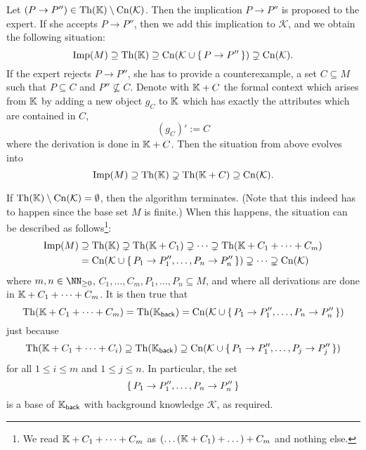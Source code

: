 Let $(P \to P'') \in \operatorname{Th}({\mathbb{K}}) \setminus \operatorname{Cn}(\mathcal{K})$.  Then the implication $P \to
P''$ is proposed to the expert.  If she accepts $P \to P''$, then we add this implication
to $\mathcal{K}$, and we obtain the following situation:
\begin{equation*}
  \operatorname{Imp}(M) \supseteq \operatorname{Th}({\mathbb{K}}) \supseteq \operatorname{Cn}(\mathcal{K} \cup {\ensuremath{\{\, P \to P'' \,\}}})
  \supsetneq \operatorname{Cn}(\mathcal{K}).
\end{equation*}
If the expert rejects $P \to P''$, she has to provide a counterexample, \ie a set $C
\subseteq M$ such that $P \subseteq C$ and $P'' \not\subseteq C$.  Denote with ${\mathbb{K}} +
C$ the formal context which arises from ${\mathbb{K}}$ by adding a new object $g_C$ to ${\mathbb{K}}$
which has exactly the attributes which are contained in $C$, \ie
\begin{equation*}
  (g_C)' := C
\end{equation*}
where the derivation is done in ${\mathbb{K}} + C$.  Then the situation from above evolves into
\begin{equation*}
  \operatorname{Imp}(M) \supseteq \operatorname{Th}({\mathbb{K}}) \supsetneq \operatorname{Th}({\mathbb{K}} + C) \supseteq \operatorname{Cn}(\mathcal{K}).
\end{equation*}

If $\operatorname{Th}({\mathbb{K}}) \setminus \operatorname{Cn}(\mathcal{K}) = \emptyset$, then the algorithm terminates.
(Note that this indeed has to happen since the base set $M$ is finite.)  When this
happens, the situation can be described as follows\footnote{We read ${\mathbb{K}} + C_1 + \dots
  + C_m$ as $(\dots({\mathbb{K}} + C_1) + \dots ) + C_m$ and nothing else.}:
\begin{align*}
  \operatorname{Imp}(M) &\supseteq \operatorname{Th}({\mathbb{K}}) \supsetneq \operatorname{Th}({\mathbb{K}} + C_1) \supsetneq \dots \supsetneq
  \operatorname{Th}({\mathbb{K}} + C_1 + \dots + C_m) \\ &= \operatorname{Cn}(\mathcal{K} \cup {\ensuremath{\{\, P_1 \to P_1'', \dots, P_n
    \to P_n'' \,\}}}) \supsetneq \dots \supsetneq \operatorname{Cn}(\mathcal{K})
\end{align*}
where $m, n \in \NN_{\geq 0}$, $C_1, \dots, C_m, P_1, \dots, P_n \subseteq M$, and where
all derivations are done in ${\mathbb{K}} + C_1 + \dots + C_m$.  It is then true that
\begin{equation*}
  \operatorname{Th}({\mathbb{K}} + C_1 + \dots + C_m) = \operatorname{Th}({\mathbb{K}}_{\mathsf{back}}) = \operatorname{Cn}(\mathcal{K} \cup
  {\ensuremath{\{\, P_1 \to P_1'', \dots, P_n \to P_n'' \,\}}})
\end{equation*}
just because
\begin{equation*}
  \operatorname{Th}({\mathbb{K}} + C_1 + \dots + C_i) \supseteq \operatorname{Th}({\mathbb{K}}_{\mathsf{back}}) \supseteq
  \operatorname{Cn}(\mathcal{K} \cup {\ensuremath{\{\, P_1 \to P_1'', \dots, P_j \to P_j''\,\}}} )
\end{equation*}
for all $1 \leq i \leq m$ and $1 \leq j \leq n$.  In particular, the set
\begin{equation*}
  {\ensuremath{\{\,P_1 \to P_1'', \dots, P_n \to P_n''\,\}}}
\end{equation*}
is a base of ${\mathbb{K}}_{\mathsf{back}}$ with background knowledge $\mathcal{K}$, as
required.

